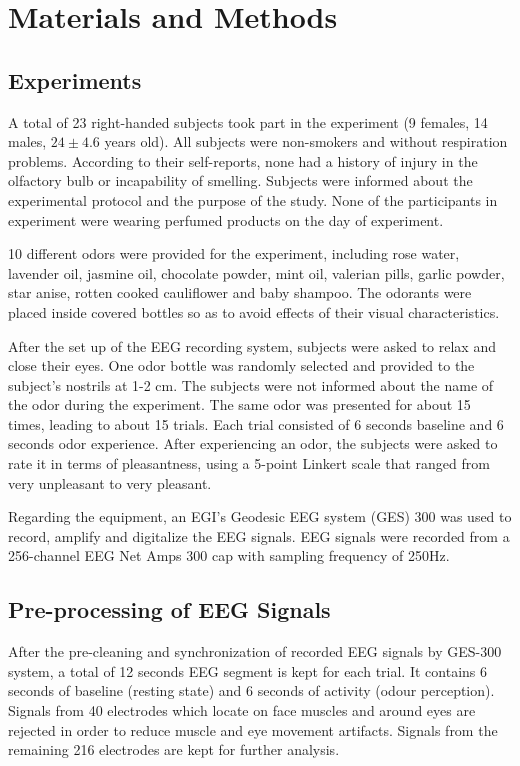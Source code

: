 \section{Materials and Methods}

\subsection{Experiments}
A total of 23 right-handed subjects took part in the experiment (9 females, 14 males, $24 \pm 4.6$ years old). All subjects were non-smokers and without respiration problems. According to their self-reports, none had a history of injury in the olfactory bulb or incapability of smelling. Subjects were informed about the experimental protocol and the purpose of the study. None of the participants in experiment were wearing perfumed products on the day of experiment. 

10 different odors were provided for the experiment, including rose water, lavender oil, jasmine oil, chocolate powder, mint oil, valerian pills, garlic powder, star anise, rotten cooked cauliflower and baby shampoo. The odorants were placed inside covered bottles so as to avoid effects of their visual characteristics.

After the set up of the EEG recording system, subjects were asked to relax and close their eyes. One odor bottle was randomly selected and provided to the subject's nostrils at 1-2 cm. The subjects were not informed about the name of the odor during the experiment. The same odor was presented for about 15 times, leading to about 15 trials. Each trial consisted of 6 seconds baseline and 6 seconds odor experience. After experiencing an odor, the subjects were asked to rate it in terms of pleasantness, using a 5-point Linkert scale that ranged from very unpleasant to very pleasant. 

Regarding the equipment, an EGI's Geodesic EEG system (GES) 300 was used to record, amplify and digitalize the EEG signals. EEG signals were recorded from a 256-channel EEG Net Amps 300 cap with sampling frequency of 250Hz.  

\subsection{Pre-processing of EEG Signals}
After the pre-cleaning and synchronization of recorded EEG signals by GES-300 system, a total of 12 seconds EEG segment is kept for each trial. It contains 6 seconds of baseline (resting state) and 6 seconds of activity (odour perception). Signals from 40 electrodes which locate on face muscles and around eyes are rejected in order to reduce muscle and eye movement artifacts. Signals from the remaining 216 electrodes are kept for further analysis. 

